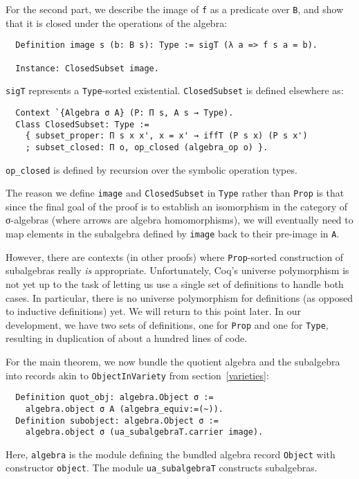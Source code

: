 \documentclass[a4paper,10pt,runningheads]{llncs}
\begin{document}
For the second part, we describe the image of \lstinline|f| as a predicate over \lstinline|B|, and show that it is closed under the operations of the algebra: 
\begin{lstlisting}
  Definition image s (b: B s): Type := sigT (λ a => f s a = b).

  Instance: ClosedSubset image.
\end{lstlisting}
\lstinline|sigT| represents a \lstinline|Type|-sorted existential. \lstinline|ClosedSubset| is defined elsewhere as:
\begin{lstlisting}
  Context `{Algebra σ A} (P: Π s, A s → Type).
  Class ClosedSubset: Type :=
    { subset_proper: Π s x x', x = x' → iffT (P s x) (P s x')
    ; subset_closed: Π o, op_closed (algebra_op o) }.
\end{lstlisting}
\lstinline|op_closed| is defined by recursion over the symbolic operation types.

The reason we define \lstinline|image| and \lstinline|ClosedSubset| in \lstinline|Type| rather than \lstinline|Prop| is that since the final goal of the proof is to establish an isomorphism in the category of σ-algebras (where arrows are algebra homomorphisms), we will eventually need to map elements in the subalgebra defined by \lstinline|image| back to their pre-image in \lstinline|A|.

However, there are contexts (in other proofs) where \lstinline|Prop|-sorted construction of subalgebras really \emph{is} appropriate. Unfortunately, Coq's universe polymorphism is not yet up to the task of letting us use a single set of definitions to handle both cases. In particular, there is no universe polymorphism for definitions (as opposed to inductive definitions) yet. We will return to this point later. In our development, we have two sets of definitions, one for \lstinline|Prop| and one for \lstinline|Type|, resulting in duplication of about a hundred lines of code.

For the main theorem, we now bundle the quotient algebra and the subalgebra into records akin to \lstinline|ObjectInVariety| from section~\ref{varieties}:
\begin{lstlisting}
  Definition quot_obj: algebra.Object σ :=
    algebra.object σ A (algebra_equiv:=(~)).
  Definition subobject: algebra.Object σ :=
    algebra.object σ (ua_subalgebraT.carrier image).
\end{lstlisting}
Here, \lstinline|algebra| is the module defining the bundled algebra record \lstinline|Object| with constructor \lstinline|object|. The module \lstinline|ua_subalgebraT| constructs subalgebras.
\end{document}
